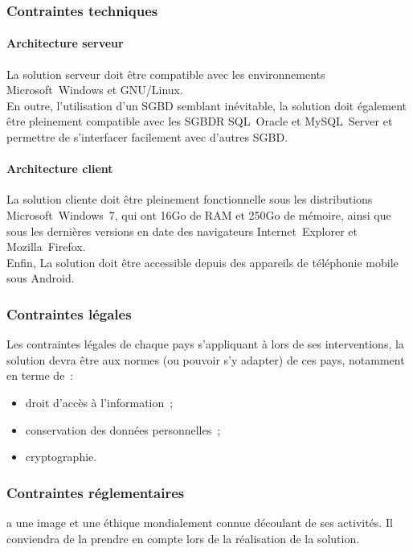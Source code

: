 \subsubsection{Contraintes techniques}

\paragraph{Architecture serveur}
La solution serveur doit être compatible avec les environnements Microsoft~Windows et GNU/Linux.
\\
En outre, l'utilisation d'un SGBD semblant inévitable, la solution doit également être pleinement compatible avec les SGBDR SQL~Oracle et MySQL~Server et permettre de s'interfacer facilement avec d'autres SGBD.

\paragraph{Architecture client}
La solution cliente doit être pleinement fonctionnelle sous les distributions Microsoft~Windows~7, qui ont 16Go de RAM et 250Go de mémoire, ainsi que sous les dernières versions en date des navigateurs Internet~Explorer et Mozilla~Firefox.
\\
Enfin, La solution doit être accessible depuis des appareils de téléphonie mobile sous Android.

\subsubsection{Contraintes légales}
Les contraintes légales de chaque pays s'appliquant à \mo lors de ses interventions, la solution devra être aux normes (ou pouvoir s'y adapter) de ces pays, notamment en terme de~:
\begin{itemize}
\item droit d'accès à l'information~;
\item conservation des données personnelles~;
\item cryptographie.
\end{itemize}

\subsubsection{Contraintes réglementaires}
\mo a une image et une éthique mondialement connue découlant de ses activités. Il conviendra de la prendre en compte lors de la réalisation de la solution.

